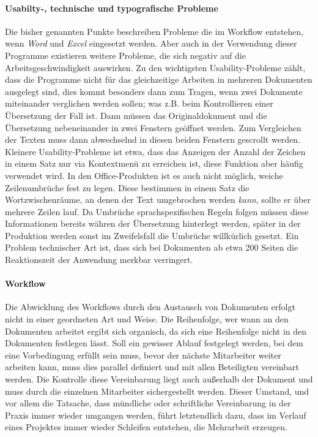 \paragraph{Usabilty-, technische und typografische Probleme} Die bisher genannten Punkte beschreiben Probleme die im Workflow entstehen, wenn \emph{Word} und \emph{Excel} eingesetzt werden. Aber auch in der Verwendung dieser Programme existieren weitere Probleme, die sich negativ auf die Arbeitsgeschwindigkeit auswirken. Zu den wichtigsten Usability-Probleme zählt, dass die Programme nicht für das gleichzeitige Arbeiten in mehreren Dokumenten ausgelegt sind, dies kommt besonders dann zum Tragen, wenn zwei Dokumente miteinander verglichen werden sollen; was z.B. beim Kontrollieren einer Übersetzung der Fall ist. Dann müssen das Originaldokument und die Übersetzung nebeneinander in zwei Fenstern geöffnet werden. Zum Vergleichen der Texten muss dann abwechselnd in diesen beiden Fenstern gescrollt werden. Kleinere Usability-Probleme ist etwa, dass das Anzeigen der Anzahl der Zeichen in einem Satz nur via Kontextmenü zu erreichen ist, diese Funktion aber häufig verwendet wird. In den Office-Produkten ist es auch nicht möglich, weiche Zeilenumbrüche fest zu legen. Diese bestimmen in einem Satz die Wortzwischenräume, an denen der Text umgebrochen werden \emph{kann}, sollte er über mehrere Zeilen lauf. Da Umbrüche sprachspezifischen Regeln folgen müssen diese Informationen bereits währen der Übersetzung hinterlegt werden, später in der Produktion werden sonst im Zweifelsfall die Umbrüche willkürlich gesetzt. Ein Problem technischer Art ist, dass sich bei Dokumenten ab etwa 200 Seiten die Reaktionszeit der Anwendung merkbar verringert.

\paragraph{Workflow} Die Abwicklung des Workflows durch den Austausch von Dokumenten erfolgt nicht in einer geordneten Art und Weise. Die Reihenfolge, wer wann an den Dokumenten arbeitet ergibt sich organisch, da sich eine Reihenfolge nicht in den Dokumenten festlegen lässt. Soll ein gewisser Ablauf festgelegt werden, bei dem eine Vorbedingung erfüllt sein muss, bevor der nächste Mitarbeiter weiter arbeiten kann, muss dies parallel definiert und mit allen Beteiligten vereinbart werden. Die Kontrolle diese Vereinbarung liegt auch außerhalb der Dokument und muss durch die einzelnen Mitarbeiter sichergestellt werden. Dieser Umstand, und vor allem die Tatsache, dass mündliche oder schriftliche Vereinbarung in der Praxis immer wieder umgangen werden, führt letztendlich dazu, dass im Verlauf eines Projektes immer wieder Schleifen entstehen, die Mehrarbeit erzeugen.

